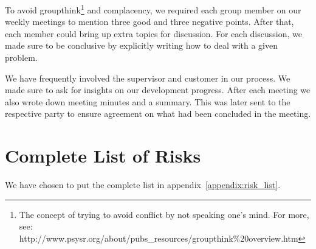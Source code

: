 To avoid groupthink\footnote{The concept of trying to avoid conflict
by not speaking one's mind. For more, see:
http://www.psysr.org/about/pubs\_resources/groupthink\%20overview.htm}
and complacency, we required each group member on our weekly meetings
to mention three good and three negative points. After that, each
member could bring up extra topics for discussion. For each discussion,
we made sure to be conclusive by explicitly writing how to deal with a
given problem. 

We have frequently involved the supervisor and customer in our process.
We made sure to ask for insights on our development progress. After
each meeting we also wrote down meeting minutes and a summary. This was
later sent to the respective party to ensure agreement on what had been
concluded in the meeting.

\section{Complete List of Risks}
We have chosen to put the complete list in appendix~\ref{appendix:risk_list}.
